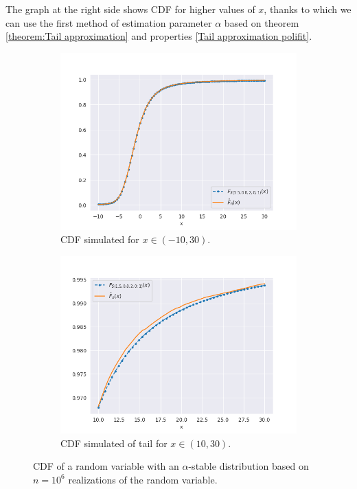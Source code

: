 \documentclass{article}
\begin{document}
        The graph at the right side shows CDF for higher values of $x$, thanks to which we can use the first method of estimation parameter $\alpha$ based on theorem \ref{theorem:Tail approximation} and properties \ref{Tail approximation polifit}.		
		\begin{figure}[H]
			\begin{subfigure}[h]{.5\textwidth}
				\centering
				\includegraphics[width=1\linewidth]{images/stable_CDF.png}
				\caption{CDF simulated for $x \in (-10,30)$.}
			\end{subfigure}
			\begin{subfigure}[r]{.5\textwidth}
				\centering
				\includegraphics[width=1\linewidth]{images/stable_CDF_large_x.png}
				\caption{CDF simulated of tail for $x \in (10,30)$.}
			\end{subfigure}
			\caption{CDF of a random variable with an $\alpha$-stable distribution based on $n=10^6$ realizations of the random variable.}\label{stable_cdf}
		\end{figure}
\end{document}
